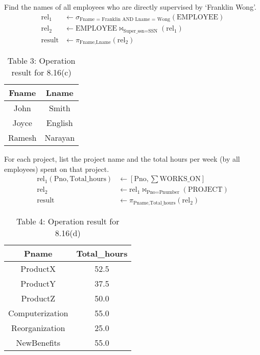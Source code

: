 \documentclass{article}
\begin{document}
\begin{parlist}
    \item Find the names of all employees who are directly supervised by `Franklin Wong'.
    \begin{align*}
        \text{rel}_1 &\leftarrow \sigma_{\text{Fname = Franklin AND Lname = Wong}}(\text{EMPLOYEE}) \\
        \text{rel}_2 &\leftarrow \text{EMPLOYEE} \bowtie_{\text{Super\_ssn=SSN}}(\text{rel}_1) \\
        \text{result} &\leftarrow \pi_{\text{Fname,Lname}}(\text{rel}_2)
    \end{align*}

    \begin{table}[h!]
        \centering
        \caption*{Table 3: Operation result for 8.16(c)}
        \begin{tabularx}{0.5\textwidth}{|C|C|}
            \hline \textbf{Fname} & \textbf{Lname} \\ \hline
            John & Smith \\ \hline
            Joyce & English \\ \hline
            Ramesh & Narayan \\ \hline
        \end{tabularx}
    \end{table}

    \item For each project, list the project name and the total hours per week (by all employees) spent on that project.
    \begin{align*}
        \text{rel}_1\left(\text{Pno}, \text{Total\_hours}\right) &\leftarrow \left[\text{Pno}, \sum \text{WORKS\_ON}\right] \\
        \text{rel}_2 &\leftarrow \text{rel}_1 \bowtie_{\text{Pno=Pnumber}}(\text{PROJECT}) \\
        \text{result} &\leftarrow \pi_{\text{Pname,Total\_hours}}(\text{rel}_2)
    \end{align*}

    \begin{table}[h!]
        \centering
        \caption*{Table 4: Operation result for 8.16(d)}
        \begin{tabularx}{0.5\textwidth}{|C|C|}
            \hline \textbf{Pname} & \textbf{Total\_hours} \\ \hline
            ProductX & 52.5 \\ \hline
            ProductY & 37.5 \\ \hline
            ProductZ & 50.0 \\ \hline
            Computerization & 55.0 \\ \hline
            Reorganization & 25.0 \\ \hline
            NewBenefits & 55.0 \\ \hline
        \end{tabularx}
    \end{table}


\end{parlist}
\end{document}
